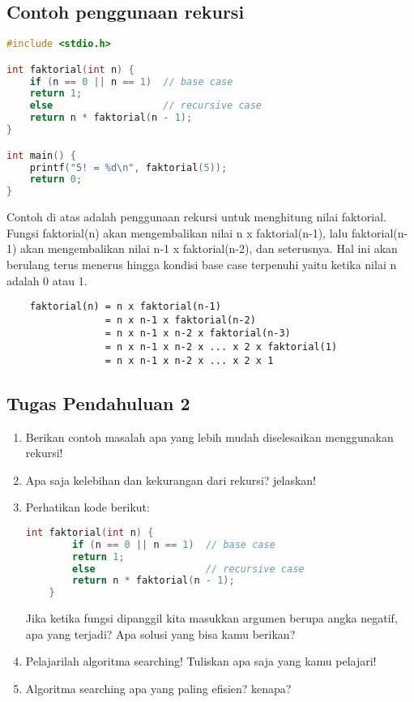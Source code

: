 \subsection{Contoh penggunaan rekursi}

\begin{lstlisting}[language=c]
#include <stdio.h>

int faktorial(int n) {
	if (n == 0 || n == 1)  // base case
	return 1;
	else                   // recursive case
	return n * faktorial(n - 1);
}

int main() {
	printf("5! = %d\n", faktorial(5));
	return 0;
}
\end{lstlisting}
Contoh di atas adalah penggunaan rekursi untuk menghitung nilai faktorial.
Fungsi faktorial(n) akan mengembalikan nilai n x faktorial(n-1), lalu faktorial(n-1) akan mengembalikan nilai n-1 x faktorial(n-2), dan seterusnya.
Hal ini akan berulang terus menerus hingga kondisi base case terpenuhi yaitu ketika nilai n adalah 0 atau 1.
\begin{verbatim}
    faktorial(n) = n x faktorial(n-1)
                 = n x n-1 x faktorial(n-2)
                 = n x n-1 x n-2 x faktorial(n-3)
                 = n x n-1 x n-2 x ... x 2 x faktorial(1)
                 = n x n-1 x n-2 x ... x 2 x 1
\end{verbatim}

\subsection*{Tugas Pendahuluan 2}
\begin{enumerate}
    \item Berikan contoh masalah apa yang lebih mudah diselesaikan menggunakan rekursi!
    \item Apa saja kelebihan dan kekurangan dari rekursi? jelaskan!
    \item Perhatikan kode berikut:
    \begin{lstlisting}[language=c]
	int faktorial(int n) {
		if (n == 0 || n == 1)  // base case
		return 1;
		else                   // recursive case
		return n * faktorial(n - 1);
	}
\end{lstlisting}
   Jika ketika fungsi dipanggil kita masukkan argumen berupa angka negatif, apa yang terjadi?
   Apa solusi yang bisa kamu berikan?
    \item Pelajarilah algoritma searching! Tuliskan apa saja yang kamu pelajari!
    \item Algoritma searching apa yang paling efisien? kenapa?
\end{enumerate}